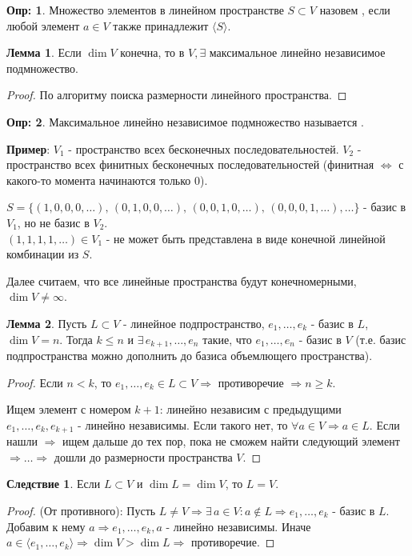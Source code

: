 \documentclass[12pt]{article}
\theoremstyle{definition}
\newtheorem{defn}{Опр:}
\newtheorem{lemma}{Лемма}
\newtheorem{corollary}{Следствие}
\begin{document}
\begin{defn}
	Множество элементов в линейном пространстве $S \subset V$ назовем , если любой элемент $a \in V$ также принадлежит $\langle S\rangle$.
\end{defn}
\begin{lemma}
	Если $\dim{V}$ конечна, то в $V, \exists$ максимальное линейно независимое подмножество.
\end{lemma}
\begin{proof}
	По алгоритму поиска размерности линейного пространства.
\end{proof}
\begin{defn}
	Максимальное линейно независимое подмножество называется .
\end{defn}

\textbf{Пример}: $V_1$ - пространство всех бесконечных последовательностей. $V_2$ - пространство всех финитных бесконечных последовательностей (финитная $\Leftrightarrow$ с какого-то момента начинаются только $0$).

$S = \{(1,0,0,0, \dotsc),\, (0,1,0,0,\dotsc),\, (0,0,1,0,\dotsc),\,(0,0,0,1,\dotsc), \dotsc \}$ - базис в $V_1$, но не базис в $V_2$. \\
$(1,1,1,1,\dotsc) \in V_1$ - не может быть представлена в виде конечной линейной комбинации из $S$.

Далее считаем, что все линейные пространства будут конечномерными, $\dim{V} \neq \infty$.

\begin{lemma}
	Пусть $L \subset V$ - линейное подпространство, $e_1,\dotsc, e_k$ - базис в $L$, $\dim{V} =n $. Тогда $k \leq n$ и $\exists \, e_{k+1},\dotsc, e_n$ такие, что $e_1,\dotsc,e_n$ - базис в $V$ (т.е. базис подпространства можно дополнить до базиса объемлющего пространства).	
\end{lemma}
\begin{proof}
	Если $n < k$, то $e_1,\dotsc, e_k \in L \subset V \Rightarrow$ противоречие $\Rightarrow n \geq k$.
	
	Ищем элемент с номером $k+1$: линейно независим с предыдущими $e_1,\dotsc, e_k, e_{k+1}$ - линейно независимы. Если такого нет, то $\forall a \in V \Rightarrow a \in L$. Если нашли $\Rightarrow$ ищем дальше до тех пор, пока не сможем найти следующий элемент $\Rightarrow \dotsc \Rightarrow$ дошли до размерности пространства $V$.
\end{proof}

\begin{corollary}
	Если $L \subset V$ и $\dim{L} = \dim{V}$, то $L = V$.
\end{corollary}
\begin{proof}
	(От противного): Пусть $L \neq V \Rightarrow \exists \, a \in V \colon a\notin L \Rightarrow e_1, \dotsc, e_k$ - базис в $L$. Добавим к нему $a \Rightarrow e_1, \dotsc, e_k, a$ - линейно независимы. Иначе $a \in \langle e_1,\dotsc, e_k \rangle \Rightarrow \dim{V} > \dim{L} \Rightarrow$ противоречие.
\end{proof}
\end{document}

